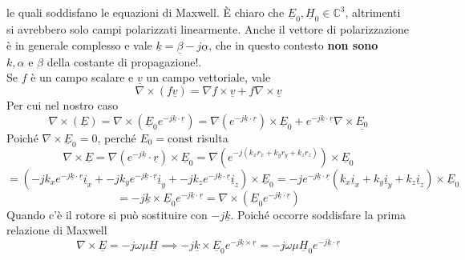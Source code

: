 \documentclass{book}
\begin{document}
    le quali soddisfano le equazioni di Maxwell. È chiaro che $\underline{E}_{0}, \underline{H}_{0} \in \mathbb{C} ^{3}$, altrimenti si avrebbero solo campi polarizzati linearmente. Anche il vettore di
    polarizzazione è in generale complesso e vale $\underline{k} = \underline{\beta} - j \underline{\alpha}$, che in questo contesto \textbf{non sono } $k, \alpha \textrm{ e } \beta $ della costante di propagazione!.
    \\ Se $f$ è un campo scalare e $\underline{v}$ un campo vettoriale, vale
    \begin{equation}
        \nabla \times (f \underline{v}) = \nabla f \times \underline{v}+f \nabla \times \underline{v}
    \end{equation}
    Per cui nel nostro caso
    \begin{equation}
        \nabla \times (\underline{E}) = \nabla \times (\underline{E}_{0} e^{-j \underline{k} \cdot \underline{r}}) = \nabla(e^{-j\underline{k}\cdot \underline{r}}) \times \underline{E}_{0} +
        e^{-j\underline{k} \cdot \underline{r}} \nabla \times \underline{E_{0}}
    \end{equation}
    Poiché $\nabla \times \underline{E}_{0} = 0$, perché $E_{0}=\textrm{const}$ risulta
    \begin{equation}
        \nabla \times \underline{E} = \nabla (e^{-j \underline{k}}\cdot \underline{r})\times \underline{E}_{0} = \nabla (e^{-j(k_{x}r_{x} + k_{y}r_{y} + k_{z}r_{z})}) \times \underline{E}_{0}
    \end{equation}
    \begin{equation}
        = (-jk_{x}e^{-j\underline{k} \cdot \underline{r}}\underline{i}_{x} + -jk_{y}e^{-j\underline{k} \cdot \underline{r}}\underline{i}_{y} +
        -jk_{z}e^{-j\underline{k} \cdot \underline{r}}\underline{i}_{z}) \times \underline{E}_{0} = -je^{-j \underline{k} \cdot \underline{r}}
        (k_{x}\underline{i}_{x} + k_{y}\underline{i}_{y} + k_{z}\underline{i}_{z}) \times \underline{E}_{0}
    \end{equation}
    \begin{equation}
        = -j \underline{k} \times \underline{E}_{0} e^{-j \underline{k} \cdot \underline{r}} = \nabla \times (\underline{E}_{0} e^{-j \underline{k} \cdot \underline{r}})
    \end{equation}
    Quando c'è il rotore si può sostituire con $-j\underline{k}$. Poiché occorre soddisfare la prima relazione di Maxwell
    \begin{equation}
        \nabla \times \underline{E} = -j \omega \mu \underline{H} \implies -j \underline{k} \times \underline{E}_{0}e^{-j \underline{k} \times \underline{r}} = -j \omega \mu \underline{H}_{0}e^{-j \underline{k} \cdot \underline{r}}
    \end{equation}
\end{document}
